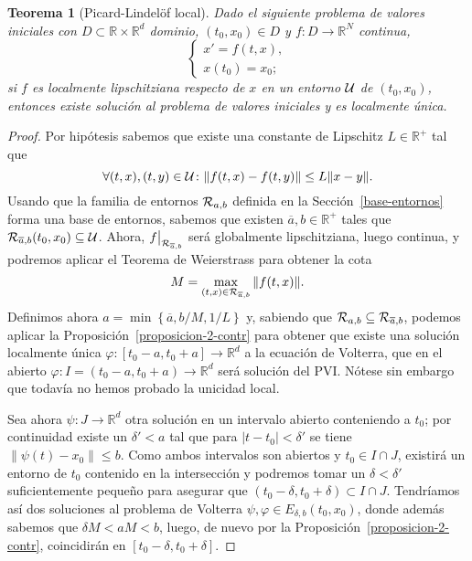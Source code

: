 \documentclass[11pt]{article}
\theoremstyle{plain}
\newtheorem{theorem}{Teorema}
\theoremstyle{definition}
\theoremstyle{remark}
\begin{document}
\begin{theorem}[Picard-Lindelöf local]\label{picard-lindelof-local}
  Dado el siguiente problema de valores iniciales con \(D \subset \mathbb{R}\times \mathbb{R}^d\) dominio,
  \((t_0,x_0) \in D\) y \(f \colon D \to \mathbb{R}^N\) continua,
  \[\left\{\begin{array}{l}
             x' = f(t,x), \\
             x(t_0) = x_0;
           \end{array}\right.\]
  si \(f\) es localmente lipschitziana respecto de \(x\) en un entorno ${\cal U}$ de \((t_0,x_0)\),
  entonces existe solución al problema de valores iniciales y es
  localmente única.
\end{theorem}
\begin{proof}
  Por hipótesis sabemos que existe una constante de Lipschitz $L \in \mathbb{R}^+$
  tal que
  \[ \forall (t,x),(t,y) \in {\cal U}\colon \| f(t,x) - f(t,y) \| \leq L\|x-y\|. \]
  Usando que la familia de entornos ${\cal R}_{a,b}$ definida en la Sección~\ref{base-entornos}
  forma una base de entornos, sabemos que existen $\overline{a},b \in \mathbb{R}^+$ tales que ${\cal R}_{\overline{a},b}(t_0,x_0) \subseteq {\cal U}$.
  Ahora, $\restr{f}{{\cal R}_{\overline{a},b}}$ será globalmente lipschitziana, luego continua, y podremos
  aplicar el Teorema de Weierstrass para obtener la cota
  \[M = \max_{(t,x) \in {\cal R}_{\overline{a},b}} \|f(t,x)\|.\]
  Definimos ahora $a = \min\left\{ \overline{a}, b/M, 1/L \right\}$ y, sabiendo que ${\cal R}_{a,b} \subseteq {\cal R}_{\overline{a},b}$, podemos aplicar
  la Proposición~\ref{proposicion-2-contr} para obtener que existe una solución
  localmente única $\varphi \colon [t_0-a,t_0+a] \to \mathbb{R}^d$ a la ecuación de Volterra, que en el
  abierto $\varphi \colon I = (t_0-a,t_0+a) \to \mathbb{R}^d$ será solución del PVI\@. Nótese sin embargo que
  todavía no hemos probado la unicidad local.
  
  Sea ahora $\psi \colon J \to \mathbb{R}^d$ otra solución en un intervalo abierto conteniendo
  a $t_0$; por continuidad existe un $\delta' < a$ tal que para $|t - t_0| < \delta'$ se tiene
  $\|\psi(t) - x_0\| \leq b$. Como ambos intervalos son abiertos y $t_0 \in I \cap J$, existirá
  un entorno de $t_0$ contenido en la intersección y podremos tomar un
  $\delta < \delta'$ suficientemente pequeño para asegurar que $(t_0-\delta, t_0+\delta) \subset I \cap J$.
  Tendríamos así dos soluciones al problema de Volterra $\psi,\varphi \in E_{\delta,b}(t_0,x_0)$,
  donde además sabemos que $\delta M < aM < b$, luego, de nuevo por la
  Proposición~\ref{proposicion-2-contr}, coincidirán en $[t_0-\delta,t_0+\delta]$.
\end{proof}
\end{document}
